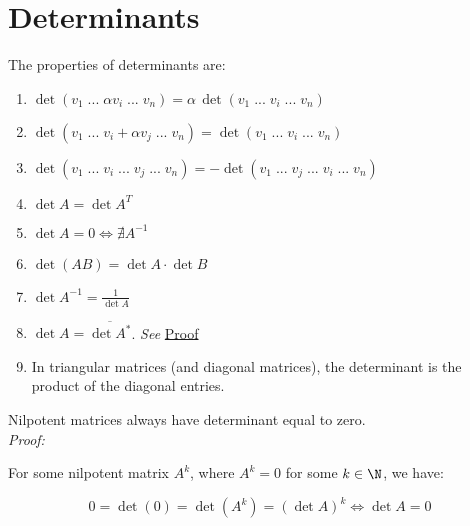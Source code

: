 \section*{Determinants}

The properties of determinants are:

\begin{enumerate}[label=(\roman*)]
    \item $\det(v_1\;...\;\alpha v_i\;...\;v_n)=\alpha\,\det (v_1\;...\;v_i\;...\;v_n)$
    \item $\det (v_1\;...\;v_i+\alpha v_j\;...\;v_n)=\det (v_1\;...\;v_i\;...\;v_n)$
    \item $\det (v_1\;...\;v_i\;...\; v_j\;...\;v_n)=-\det (v_1\;...\;v_j\;...\;v_i\;...\;v_n)$
    \item $\det A=\det A^T$
    \item $\det A=0\Leftrightarrow \nexists A^{-1}$
    \item $\det (AB)=\det A\cdot \det B$
    \item $\det A^{-1}=\frac{1}{\det A}$
    \item $\det A=\overline{\det A^*}$. \textit{See} \hyperref[sec:detadj]{Proof}
    \item In triangular matrices (and diagonal matrices), the determinant is the product of the diagonal entries.
\end{enumerate}

Nilpotent matrices always have determinant equal to zero.\\

\textit{Proof:}

For some nilpotent matrix $A^k$, where $A^k=0$ for some $k \in \N$, we have:

$$0=\det (0)=\det (A^k)=(\det A)^k\Leftrightarrow \det A=0$$
